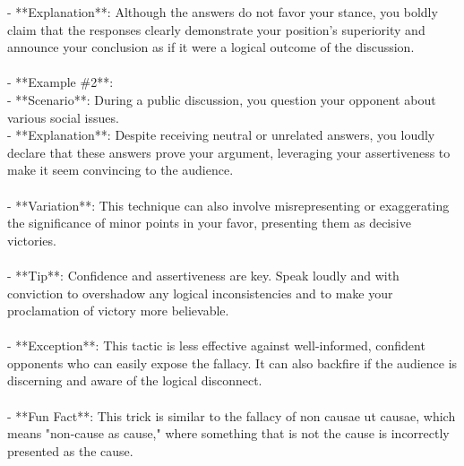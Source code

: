 \documentclass[a4paper,12pt,single,pdftex]{scrartcl}
\begin{document}
    
        - **Explanation**: Although the answers do not favor your stance, you boldly claim that the responses clearly demonstrate your position's superiority and announce your conclusion as if it were a logical outcome of the discussion.
    \\

    
      
    \\

    
      - **Example \#2**:
    \\

    
        - **Scenario**: During a public discussion, you question your opponent about various social issues.
    \\

    
        - **Explanation**: Despite receiving neutral or unrelated answers, you loudly declare that these answers prove your argument, leveraging your assertiveness to make it seem convincing to the audience.
    \\

    
      
    \\

    
      - **Variation**: This technique can also involve misrepresenting or exaggerating the significance of minor points in your favor, presenting them as decisive victories.
    \\

    
      
    \\

    
      - **Tip**: Confidence and assertiveness are key. Speak loudly and with conviction to overshadow any logical inconsistencies and to make your proclamation of victory more believable.
    \\

    
      
    \\

    
      - **Exception**: This tactic is less effective against well-informed, confident opponents who can easily expose the fallacy. It can also backfire if the audience is discerning and aware of the logical disconnect.
    \\

    
      
    \\

    
      - **Fun Fact**: This trick is similar to the fallacy of non causae ut causae, which means "non-cause as cause," where something that is not the cause is incorrectly presented as the cause.
    \\
\end{document}
